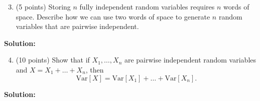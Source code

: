 \documentclass[11pt]{article}
\newcommand{\Var}[1]{\ensuremath{\text{Var}\left[#1\right]}}
\begin{document}
\begin{enumerate}
\setcounter{enumi}{2}
\item (5 points)
Storing $n$ fully independent random variables requires $n$ words of space. Describe how we can use two words of space to generate $n$ random variables that are pairwise independent. 
\end{enumerate}

\noindent\textbf{Solution:}











\begin{enumerate}
\setcounter{enumi}{3}
\item (10 points)
Show that if $X_1,\ldots,X_n$ are pairwise independent random variables and $X=X_1+\ldots+X_n$, then
\[\Var{X}=\Var{X_1}+\ldots+\Var{X_n}.\]
\end{enumerate}

\noindent\textbf{Solution:}
\end{document}
